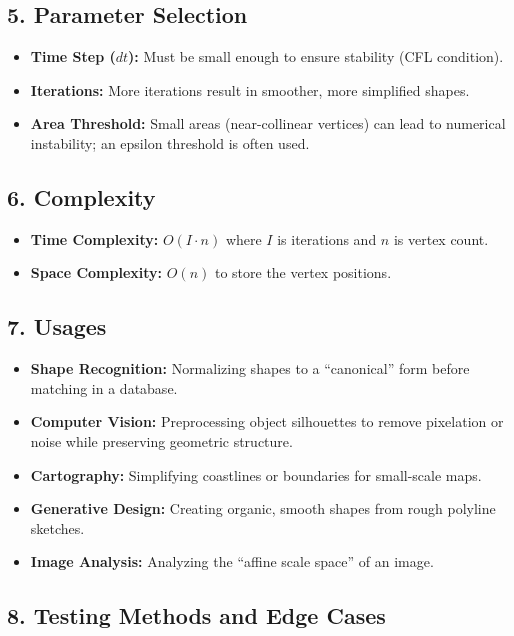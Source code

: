 \subsection{5. Parameter Selection}

\begin{itemize}
    \item \textbf{Time Step ($dt$):} Must be small enough to ensure stability (CFL condition).
    \item \textbf{Iterations:} More iterations result in smoother, more simplified shapes.
    \item \textbf{Area Threshold:} Small areas (near-collinear vertices) can lead to numerical instability; an epsilon threshold is often used.
\end{itemize}

\subsection{6. Complexity}

\begin{itemize}
    \item \textbf{Time Complexity:} $O(I \cdot n)$ where $I$ is iterations and $n$ is vertex count.
    \item \textbf{Space Complexity:} $O(n)$ to store the vertex positions.
\end{itemize}

\subsection{7. Usages}

\begin{itemize}
    \item \textbf{Shape Recognition:} Normalizing shapes to a ``canonical'' form before matching in a database.
    \item \textbf{Computer Vision:} Preprocessing object silhouettes to remove pixelation or noise while preserving geometric structure.
    \item \textbf{Cartography:} Simplifying coastlines or boundaries for small-scale maps.
    \item \textbf{Generative Design:} Creating organic, smooth shapes from rough polyline sketches.
    \item \textbf{Image Analysis:} Analyzing the ``affine scale space'' of an image.
\end{itemize}

\subsection{8. Testing Methods and Edge Cases}

